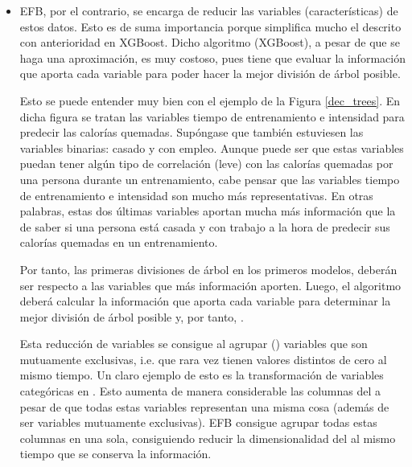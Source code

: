 {\begin{itemize}
    De manera simplificada, si un dato tiene un gradiente pequeño asociado, quiere decir que ese dato se ha predicho (considerablemente) bien y se puede eliminar del . En otras palabras, no interesa mantenerlo porque no genera mejora en el entrenamiento. En cambio, un dato con un gradiente alto, supone que el algoritmo tenga que aprender a predecirlo mejor y, por tanto, interesa mantenerlo. 
    
    De esta manera, GOSS, a un nivel alto de abstracción, mantiene los datos del  con un gradiente asociado alto, mientras que descarta aquellos datos con un gradiente asociado bajo (esto supone que la distribución de los datos sea alterada y matemáticas adicionales son implementadas; pero esto va más allá del alcance de este trabajo). Que el gradiente sea alto o bajo es determinado por un umbral.
    
    \item EFB, por el contrario, se encarga de reducir las variables (características) de estos datos. Esto es de suma importancia porque simplifica mucho el  descrito con anterioridad en XGBoost. Dicho algoritmo (XGBoost), a pesar de que se haga una aproximación, es muy costoso, pues tiene que evaluar la información que aporta cada variable para poder hacer la mejor división de árbol posible.
    
    Esto se puede entender muy bien con el ejemplo de la Figura \ref{dec_trees}. En dicha figura se tratan las variables tiempo de entrenamiento e intensidad para predecir las  calorías quemadas. Supóngase que también estuviesen las variables binarias: casado y con empleo. Aunque puede ser que estas variables puedan tener algún tipo de correlación (leve) con las calorías quemadas por una persona durante un entrenamiento, cabe pensar que las variables tiempo de entrenamiento e intensidad son mucho más representativas. En otras palabras, estas dos últimas variables aportan mucha más información que la de saber si una persona está casada y con trabajo a la hora de predecir sus calorías quemadas en un entrenamiento. 
    
    Por tanto, las primeras divisiones de árbol en los primeros modelos, deberán ser respecto a las variables que más información aporten. Luego, el algoritmo deberá calcular la información que aporta cada variable para determinar la mejor división de árbol posible y, por tanto, .
    
    Esta reducción de variables se consigue al agrupar () variables que son mutuamente exclusivas, i.e. que rara vez tienen valores distintos de cero al mismo tiempo. Un claro ejemplo de esto es la transformación de variables categóricas en \fnm. Esto aumenta de manera considerable las columnas del  a pesar de que todas estas variables representan una misma cosa (además de  ser variables mutuamente exclusivas). EFB consigue agrupar todas estas columnas en una sola\fnm, consiguiendo reducir la dimensionalidad del  al mismo tiempo que se conserva la información.
\end{itemize}

}
